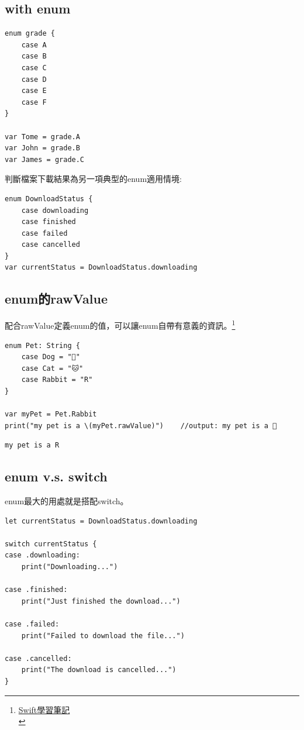 \documentclass[a4paper,12pt]{article}
\begin{document}
\subsection{with enum}
\label{sec:org5ee97fc}
\lstset{breaklines=true,language=swift,label= ,caption= ,captionpos=b,firstnumber=1,numbers=left}
\begin{lstlisting}
enum grade {
    case A
    case B
    case C
    case D
    case E
    case F
}

var Tome = grade.A
var John = grade.B
var James = grade.C
\end{lstlisting}
判斷檔案下載結果為另一項典型的enum適用情境:\\
\lstset{breaklines=true,language=swift,label= ,caption= ,captionpos=b,firstnumber=1,numbers=left}
\begin{lstlisting}
enum DownloadStatus {
    case downloading
    case finished
    case failed
    case cancelled
}
var currentStatus = DownloadStatus.downloading
\end{lstlisting}
\subsection{enum的rawValue}
\label{sec:org48270b1}

配合rawValue定義enum的值，可以讓enum自帶有意義的資訊。\footnote{\href{https://hugolu.gitbooks.io/learn-swift/content/Advanced/Enum.html}{Swift學習筆記 }\\}\\
\lstset{breaklines=true,language=swift,label= ,caption= ,captionpos=b,firstnumber=1,numbers=left}
\begin{lstlisting}
enum Pet: String {
    case Dog = "🐶"
    case Cat = "🐱"
    case Rabbit = "R"
}

var myPet = Pet.Rabbit
print("my pet is a \(myPet.rawValue)")    //output: my pet is a 🐰
\end{lstlisting}

\begin{verbatim}
my pet is a R
\end{verbatim}
\subsection{enum v.s. switch}
\label{sec:org5322659}
enum最大的用處就是搭配switch。\\
\lstset{breaklines=true,language=swift,label= ,caption= ,captionpos=b,firstnumber=1,numbers=left}
\begin{lstlisting}
let currentStatus = DownloadStatus.downloading

switch currentStatus {
case .downloading:
    print("Downloading...")

case .finished:
    print("Just finished the download...")

case .failed:
    print("Failed to download the file...")

case .cancelled:
    print("The download is cancelled...")
}
\end{lstlisting}
\end{document}
